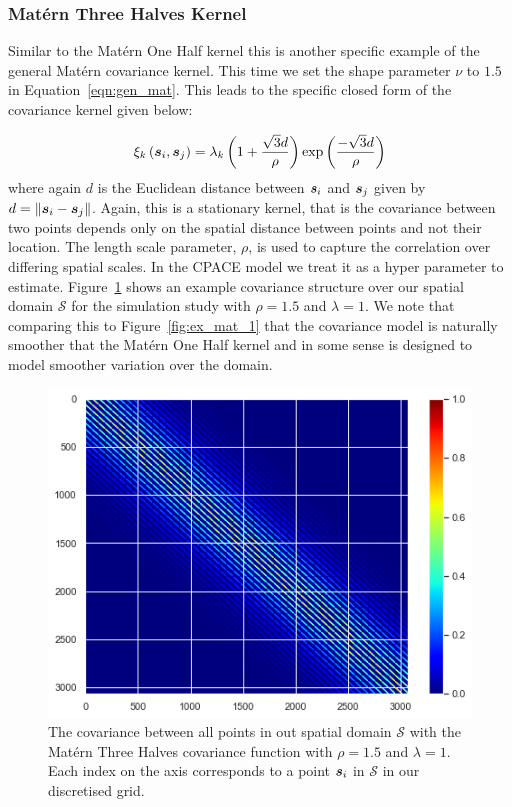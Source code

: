 \subsubsection{Mat\'ern Three Halves Kernel \label{sssec:matern_three}}
Similar to the Mat\'ern One Half kernel this is another specific example of the general Mat\'ern covariance kernel.
This time we set the shape parameter $\nu$ to $1.5$ in Equation~\ref{eqn:gen_mat}.
This leads to the specific closed form of the covariance kernel given below:

\begin{equation}
	\xi_k \left(\bm{{s}}_{i}, \bm{{s}}_{j}\right) = \lambda_k \left(1 + \frac{\sqrt{3}d}{\rho} \right)\exp \left(\frac{- \sqrt{3}d}{\rho} \right)
\end{equation}
where again $d$ is the Euclidean distance between $\bm{{s}}_{i}$ and $\bm{{s}}_{j}$ given by $d = \lVert \bm{{s}}_{i} - \bm{{s}}_{j} \rVert$. 
Again, this is a stationary kernel, that is the covariance between two points depends only on the spatial distance between points and not their location.
The length scale parameter, $\rho$, is used to capture the correlation over differing spatial scales.
In the CPACE model we treat it as a hyper parameter to estimate.
Figure~\ref{fig:ex_mat_3} shows an example covariance structure over our spatial domain $\mathcal{S}$ for the simulation study with $\rho =1.5$ and $\lambda = 1$.
We note that comparing this to Figure~\ref{fig:ex_mat_1} that the covariance model is naturally smoother that the Mat\'ern One Half kernel and in some sense is designed to model smoother variation over the domain.

\begin{figure}
	\centering
	\includegraphics[width=\textwidth]{ex_mat_3}
	\caption[An example Matern Three Halves covariance function evaluated between all spatial grid points.]{The covariance between all points in out spatial domain $\mathcal{S}$ with the Mat\'ern Three Halves covariance function with $\rho=1.5$ and $\lambda=1$. Each index on the axis corresponds to a point $\bm{{s}}_i$ in $\mathcal{S}$ in our discretised grid.}
	\label{fig:ex_mat_3}
\end{figure}

